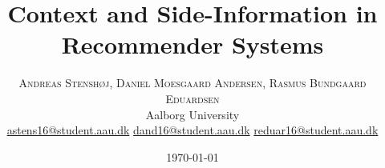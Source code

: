 %
%
%
%




\setlength{\droptitle}{-4\baselineskip} %

\pretitle{\begin{center}\Huge\bfseries} %
\posttitle{\end{center}} %
\title{Context and Side-Information in Recommender Systems} %
\author{%
\textsc{Andreas Stenshøj, Daniel Moesgaard Andersen, Rasmus Bundgaard Eduardsen} \\[1ex] %
\normalsize Aalborg University \\ %
\normalsize \href{mailto:astens16@student.aau.dk}{astens16@student.aau.dk} %
\normalsize \href{mailto:dand16@student.aau.dk}{dand16@student.aau.dk} %
\normalsize \href{mailto:reduar16@student.aau.dk}{reduar16@student.aau.dk} %
}
\date{\today} %
\renewcommand{\maketitlehookd}{%
\begin{abstract}
\noindent How do graph-based methods compare to non-graph based methods for the recommender system domain, and how does context and side-information influence the accuracy of predicted items? 
This paper investigates state-of-the-art within context-aware and graph-based recommender systems, datasets available for context-aware methods as well as useful evaluation metrics.
The outcome is a comparison of the identified methods, showing performance on a broad range of evaluation metrics on relatively small datasets.
The results show that the addition of context or side-information to recommendation systems does not necessarily improve performance, and that methods utilizing implicit ratings tend to perform worse on the investigated datasets.
\end{abstract}
}


